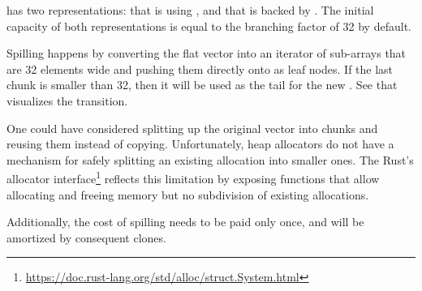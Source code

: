 \pvec{} has two representations:  that is using \stdvec{}, and  that is backed by \rrbvec{}. The initial capacity of both representations is equal to the branching factor of 32 by default.

Spilling happens by converting the flat vector into an iterator of sub-arrays that are 32 elements wide and pushing them directly onto \rrbtree{} as leaf nodes. If the last chunk is smaller than 32, then it will be used as the tail for the new \rrbvec{}. See  that visualizes the transition.

One could have considered splitting up the original vector into chunks and reusing them instead of copying. Unfortunately, heap allocators do not have a mechanism for safely splitting an existing allocation into smaller ones. The Rust's allocator interface\footnote{\url{https://doc.rust-lang.org/std/alloc/struct.System.html}} reflects this limitation by exposing functions that allow allocating and freeing memory but no subdivision of existing allocations.

Additionally, the cost of spilling needs to be paid only once, and will be amortized by  consequent clones.

